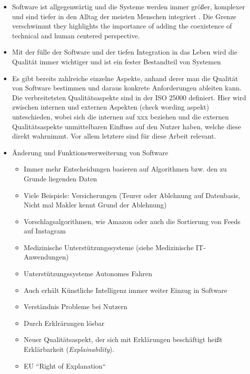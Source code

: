 \begin{itemize}
    \item Software ist allgegenwärtig und die Systeme werden immer größer, komplexer und sind tiefer in den Alltag der meisten Menschen integriert \cite{carvalho2020developers}. Die Grenze verschwimmt \cite{ehsan_human-centered_2020} they highlights the importance of adding the coexistence of technical and human centered perspective.
    \item Mit der fülle der Software und der tiefen Integration in das Leben wird die Qualität immer wichtiger und ist ein fester Bestandteil von Systemen \cite{schneider2012abenteuer}
    \item Es gibt bereits zahlreiche einzelne Aspekte, anhand derer man die Qualität von Software bestimmen und daraus konkrete Anforderungen ableiten kann. Die verbreitetsten Qualitätsaspekte sind in der ISO 25000 definiert. \cite{international2011iso}
    Hier wird zwischen internen und externen Aspekten (check wording aspekt) unteschieden, wobei sich die internen auf xxx beziehen und die externen Qualitätsaspekte unmittelbaren Einfluss auf den Nutzer haben, welche diese direkt wahrnimmt. Vor allem letztere sind für diese Arbeit relevant.
    \item Änderung und Funktionswerweiterung von Software
    \begin{itemize}
        \item Immer mehr Entscheidungen basieren auf Algorithmen bzw. den zu Grunde liegenden Daten
        \item Viele Beispiele: Versicherungen (Teurer oder Ablehnung auf Datenbasis, Nicht mal Makler kennt Grund der Ablehnung)
        \item Vorschlagsalgorithmen, wie Amazon oder auch die Sortierung von Feeds auf Instagram
        \item Medizinische Unterstützungssysteme \cite{doshi2017towards} (siehe Medizinische IT-Anwendungen)
        \item Unterstützungssysteme Autonomes Fahren
        \item Auch erhält Künstliche Intelligenz immer weiter Einzug in Software
        \item Verständnis Probleme bei Nutzern
        \item Durch Erklrärungen lösbar
        \item Neuer Qualitätsaspekt, der sich mit Erklärungen beschäftigt heißt Erklärbarkeit (\textit{Explainability}).
        \item EU “Right of Explanation“

\end{itemize}
\end{itemize}
